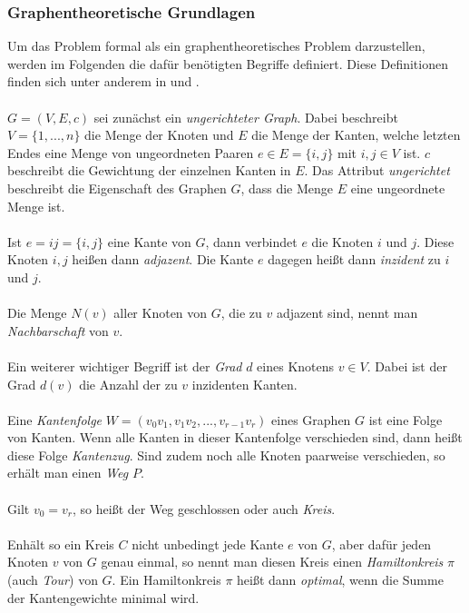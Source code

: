 \documentclass[doktyp=barbeit, sprache=german]{TUBAFarbeiten}
\begin{document}
\subsubsection{Graphentheoretische Grundlagen} \label{graphbasics}
Um das Problem formal als ein graphentheoretisches Problem darzustellen, werden im Folgenden die dafür benötigten Begriffe definiert. Diese Definitionen finden sich unter anderem in \cite{graphKemnitz} und \cite{graphDiestel}.
\\\\$G = (V,E,c)$ sei zunächst ein \textit{ungerichteter Graph}. Dabei beschreibt $V = \{1,...,n\}$ die Menge der Knoten und $E$ die Menge der Kanten, welche letzten Endes eine Menge von ungeordneten Paaren $e \in E = \{i,j\}$ mit $i,j \in V$ ist. $c$ beschreibt die Gewichtung der einzelnen Kanten in $E$. Das Attribut \textit{ungerichtet} beschreibt die Eigenschaft des Graphen $G$, dass die Menge $E$ eine ungeordnete Menge ist.
\\\\Ist $e = ij = \{i,j\}$ eine Kante von $G$, dann verbindet $e$ die Knoten $i$ und $j$. Diese Knoten $i,j$ heißen dann \textit{adjazent}. Die Kante $e$ dagegen heißt dann \textit{inzident} zu $i$ und $j$. 
\\\\Die Menge $N(v)$ aller Knoten von $G$, die zu $v$ adjazent sind, nennt man \textit{Nachbarschaft} von $v$.
\\\\Ein weiterer wichtiger Begriff ist der \textit{Grad} $d$ eines Knotens $v \in V$. Dabei ist der Grad $d(v)$ die Anzahl der zu $v$ inzidenten Kanten.
\\\\Eine \textit{Kantenfolge} $W = (v_0v_1,v_1v_2,...,v_{r-1}v_r)$ eines Graphen $G$ ist eine Folge von Kanten. Wenn alle Kanten in dieser Kantenfolge verschieden sind, dann heißt diese Folge \textit{Kantenzug}. Sind zudem noch alle Knoten paarweise verschieden, so erhält man einen \textit{Weg} $P$.
\\\\Gilt $v_0 = v_r$, so heißt der Weg geschlossen oder auch \textit{Kreis}.
\\\\Enhält so ein Kreis $C$ nicht unbedingt jede Kante $e$ von $G$, aber dafür jeden Knoten $v$ von $G$ genau einmal, so nennt man diesen Kreis einen \textit{Hamiltonkreis} $\pi$ (auch \textit{Tour}) von $G$. Ein Hamiltonkreis $\pi$ heißt dann \textit{optimal}, wenn die Summe der Kantengewichte minimal wird.
\end{document}
